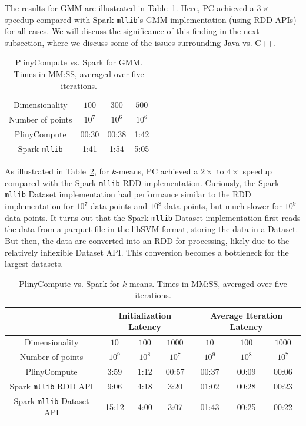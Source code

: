 The results for GMM are illustrated in Table~\ref{fig:Gmm}. Here, PC achieved a 
$3\times$ speedup compared with Spark \texttt{mllib}'s GMM implementation
(using RDD APIs) for all cases.  We will discuss the significance of this finding in the next subsection, where we discuss
some of the issues surrounding Java vs. C++.  

\begin{table}[h!]
\begin{center}
\begin{tabular}{|c||c|c|c|}
\hline
Dimensionality & $100$ & $300$ & $500$ \\
Number of points & $10^7$ & $10^6$ & $10^6$ \\
\hline
\hline
PlinyCompute &00:30 & 00:38 & 1:42 \\
Spark \texttt{mllib} &1:41  &1:54 &5:05 \\
\hline
\end{tabular}
\caption{PlinyCompute vs. Spark for GMM. Times in MM:SS, averaged over five iterations.}
\label{fig:Gmm}
\end{center}
\end{table}



As illustrated in Table~\ref{fig:KMeans}, for $k$-means, PC achieved a $2\times$ to
$4\times$ speedup compared with the Spark \texttt{mllib} RDD implementation.
Curiously, the Spark \texttt{mllib} Dataset implementation
had performance similar to the RDD implementation for
$10^7$ data points and $10^8$ data
points, but much slower for $10^9$ data points. It turns out that 
the Spark \texttt{mllib} Dataset implementation first reads the data 
from a parquet file in the libSVM format, storing the data in a Dataset.  But then, the data
are converted into an RDD for processing, likely due to the relatively inflexible Dataset API.
This conversion becomes a bottleneck for the largest datasets.

\begin{table}[h!]
\begin{center}
\begin{tabular}{|c||c|c|c||c|c|c|}
\hline
& \multicolumn{3}{c||}{Initialization Latency} & \multicolumn{3}{c|}{Average
                                         Iteration Latency} \\
\hline
Dimensionality & $10$ & $100$ & $1000$ & $10$ & $100$ & $1000$\\
Number of points & $10^9$ & $10^8$ & $10^7$ & $10^9$ & $10^8$ & $10^7$\\
\hline
PlinyCompute &3:59 & 1:12 & 00:57 &00:37 & 00:09 & 00:06\\
Spark \texttt{mllib} RDD API &9:06  &4:18 &3:20 &01:02 & 00:28 & 00:23\\
Spark \texttt{mllib} Dataset API &15:12  &4:00 &3:07 &01:43 & 00:25 & 00:22\\
\hline
\end{tabular}
\caption{PlinyCompute vs. Spark for $k$-means. Times in MM:SS, averaged over five iterations.}
\label{fig:KMeans}
\end{center}
\end{table}


